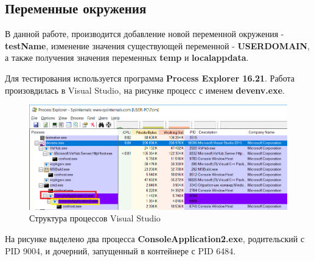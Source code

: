\subsection{Переменные окружения}
В данной работе, производится добавление новой переменной окружения - \textbf{testName}, изменение значения существующей переменной - \textbf{USERDOMAIN}, а также получения значения переменных \textbf{temp} и \textbf{localappdata}.

Для тестирования используется программа \textbf{Process Explorer 16.21}. Работа произовдилась в Visual Studio, на рисунке процесс с именем \textbf{devenv.exe}.
\begin{figure}[H]
  \centering
  \includegraphics[width=\textwidth]{img/1}
  \caption{Структура процессов Visual Studio}
\end{figure}
На рисунке выделено два процесса \textbf{ConsoleApplication2.exe}, родительский с PID 9004, и дочерний, запущенный в контейнере с PID 6484.

